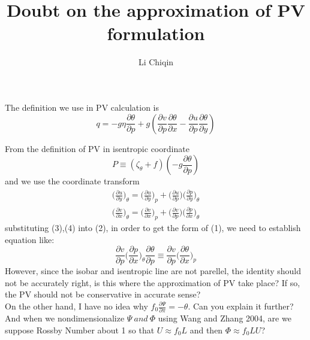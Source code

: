 \documentclass[12pt]{article}
\begin{document}
\title{Doubt on the approximation of PV formulation}
\author{Li Chiqin}
\maketitle

The definition we use in PV calculation is
\begin{equation}
    q = -g\eta\frac{\partial{\theta}}{\partial{p}} + g(\frac{\partial{v}}{\partial{p}}
    \frac{\partial{\theta}}{\partial{x}} - \frac{\partial{u}}{\partial{p}} \frac{\partial{\theta}}{\partial{y}})
\end{equation}

From the definition of PV in isentropic coordinate
\begin{equation}
    P \equiv (\zeta_{\theta} + f)(-g \frac{\partial{\theta}}{\partial{p}})
\end{equation}
and we use the coordinate transform
\begin{gather}
    \Big(\frac{\partial{u}}{\partial{y}}\Big)_{\theta} = \Big(\frac{\partial{u}}{\partial{y}}\Big)_{p}
    + \Big(\frac{\partial{u}}{\partial{p}}\Big) \Big(\frac{\partial{p}}{\partial{y}}\Big)_{\theta}\\
    \Big(\frac{\partial{v}}{\partial{x}}\Big)_{\theta} = \Big(\frac{\partial{v}}{\partial{x}}\Big)_{p}
    + \Big(\frac{\partial{v}}{\partial{p}}\Big) \Big(\frac{\partial{p}}{\partial{x}}\Big)_{\theta}
\end{gather}
substituting (3),(4) into (2), in order to get the form of (1), we need to establish equation like:
\begin{equation}
    \frac{\partial{v}}{\partial{p}} \Big(\frac{\partial{p}}{\partial{x}}\Big)_{\theta}
    \frac{\partial{\theta}}{\partial{p}} \equiv \frac{\partial{v}}{\partial{p}} \Big(\frac{\partial{\theta}}{\partial{x}}\Big)_{p}
\end{equation}
However, since the isobar and isentropic line are not parellel, the identity should not be accurately right,
is this where the approximation of PV take place? If so, the PV should not be conservative in accurate sense?\\


On the other hand, I have no idea why $f_{0}\frac{\partial{\Psi}}{\partial{\pi}} = -\theta$. Can you explain it further?
And when we nondimensionalize $\Psi\ and \ \Phi$ using Wang and Zhang 2004, are we suppose Rossby Number about 1 so that
$U \approx f_{0}L$ and then $\Phi \approx f_{0}LU$?
\end{document}
